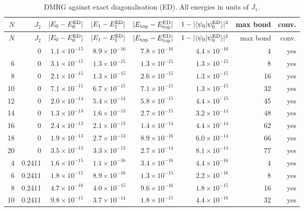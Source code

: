 \documentclass[11pt]{article}
\begin{document}
{\small
\begin{longtable}{rrrrrrrr}
\caption{DMRG against exact diagonalisation (ED). All energies in units of $J_1$.}\label{tab:ed}\\
\toprule
$N$ & $J_2$ & $|E_0-E_0^{\rm ED}|$ & $|E_1-E_1^{\rm ED}|$ & $|E_{\rm top}-E_{\rm top}^{\rm ED}|$ & $1-|\langle\psi_0|\psi_0^{\rm ED}\rangle|^2$ & max bond & conv. \\
\midrule
\endfirsthead
\toprule
$N$ & $J_2$ & $|E_0-E_0^{\rm ED}|$ & $|E_1-E_1^{\rm ED}|$ & $|E_{\rm top}-E_{\rm top}^{\rm ED}|$ & $1-|\langle\psi_0|\psi_0^{\rm ED}\rangle|^2$ & max bond & conv. \\
\midrule
\endhead
\bottomrule
\endfoot
4 & 0 & $1.1\times10^{-15}$ & $8.9\times10^{-16}$ & $7.8\times10^{-16}$ & $4.4\times10^{-16}$ & 4 & yes \\
6 & 0 & $3.1\times10^{-15}$ & $1.3\times10^{-15}$ & $1.3\times10^{-15}$ & $1.3\times10^{-15}$ & 8 & yes \\
8 & 0 & $2.1\times10^{-15}$ & $1.3\times10^{-15}$ & $2.6\times10^{-15}$ & $1.3\times10^{-15}$ & 16 & yes \\
10 & 0 & $7.1\times10^{-15}$ & $6.7\times10^{-15}$ & $7.1\times10^{-15}$ & $1.3\times10^{-15}$ & 32 & yes \\
12 & 0 & $2.0\times10^{-14}$ & $5.4\times10^{-14}$ & $5.8\times10^{-15}$ & $4.4\times10^{-15}$ & 45 & yes \\
14 & 0 & $1.3\times10^{-13}$ & $1.6\times10^{-13}$ & $2.7\times10^{-15}$ & $3.2\times10^{-14}$ & 48 & yes \\
16 & 0 & $2.4\times10^{-13}$ & $2.1\times10^{-13}$ & $1.4\times10^{-14}$ & $4.4\times10^{-14}$ & 62 & yes \\
18 & 0 & $1.9\times10^{-13}$ & $2.7\times10^{-13}$ & $8.9\times10^{-16}$ & $6.0\times10^{-14}$ & 66 & yes \\
20 & 0 & $3.5\times10^{-13}$ & $3.3\times10^{-13}$ & $2.7\times10^{-14}$ & $8.1\times10^{-14}$ & 77 & yes \\
4 & 0.2411 & $1.6\times10^{-15}$ & $1.1\times10^{-16}$ & $3.4\times10^{-16}$ & $4.4\times10^{-16}$ & 4 & yes \\
6 & 0.2411 & $1.8\times10^{-15}$ & $8.9\times10^{-16}$ & $1.3\times10^{-15}$ & $2.2\times10^{-16}$ & 8 & yes \\
8 & 0.2411 & $4.7\times10^{-16}$ & $4.0\times10^{-15}$ & $9.6\times10^{-16}$ & $1.8\times10^{-15}$ & 16 & yes \\
10 & 0.2411 & $9.8\times10^{-15}$ & $3.7\times10^{-14}$ & $1.8\times10^{-15}$ & $4.4\times10^{-16}$ & 32 & yes \\

\end{longtable}}
\end{document}
